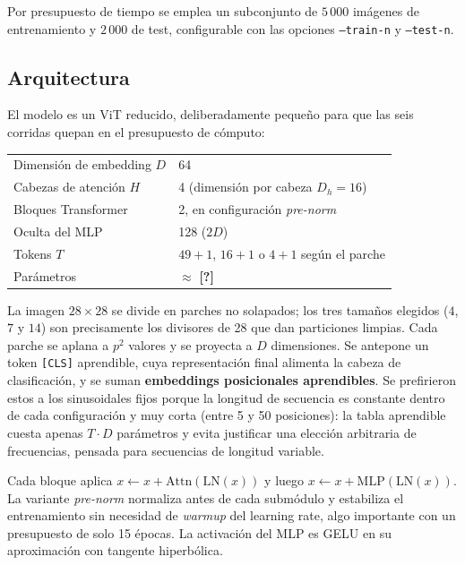 \documentclass[11pt,a4paper]{article}
\providecommand{\KpiParams}{\textbf{[?]}}
\begin{document}
Por presupuesto de tiempo se emplea un subconjunto de $5\,000$ imágenes de
entrenamiento y $2\,000$ de test, configurable con las opciones
\texttt{--train-n} y \texttt{--test-n}.

\subsection{Arquitectura}

El modelo es un ViT reducido, deliberadamente pequeño para que las seis
corridas quepan en el presupuesto de cómputo:

\begin{center}\small
\begin{tabular}{ll}
\toprule
Dimensión de embedding $D$ & 64 \\
Cabezas de atención $H$ & 4 (dimensión por cabeza $D_h = 16$) \\
Bloques Transformer & 2, en configuración \emph{pre-norm} \\
Oculta del MLP & 128 ($2D$) \\
Tokens $T$ & $49{+}1$, $16{+}1$ o $4{+}1$ según el parche \\
Parámetros & $\approx$ \KpiParams \\
\bottomrule
\end{tabular}
\end{center}

La imagen $28\times28$ se divide en parches no solapados; los tres tamaños
elegidos ($4$, $7$ y $14$) son precisamente los divisores de 28 que dan
particiones limpias. Cada parche se aplana a $p^2$ valores y se proyecta a $D$
dimensiones. Se antepone un token \texttt{[CLS]} aprendible, cuya representación
final alimenta la cabeza de clasificación, y se suman \textbf{embeddings
posicionales aprendibles}. Se prefirieron estos a los sinusoidales fijos porque
la longitud de secuencia es constante dentro de cada configuración y muy corta
(entre 5 y 50 posiciones): la tabla aprendible cuesta apenas $T \cdot D$
parámetros y evita justificar una elección arbitraria de frecuencias, pensada
para secuencias de longitud variable.

Cada bloque aplica $x \leftarrow x + \mathrm{Attn}(\mathrm{LN}(x))$ y luego
$x \leftarrow x + \mathrm{MLP}(\mathrm{LN}(x))$. La variante \emph{pre-norm}
\cite{xiong2020layer} normaliza antes de cada submódulo y estabiliza el
entrenamiento sin necesidad de \emph{warmup} del learning rate, algo importante
con un presupuesto de solo 15 épocas. La activación del MLP es GELU
\cite{hendrycks2016gaussian} en su aproximación con tangente hiperbólica.
\end{document}
